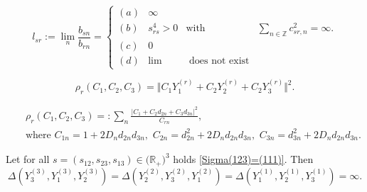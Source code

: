 \documentclass[10pt,a4paper]{amsart}
\begin{document}
\begin{equation}
\label{l(sr)}
l_{sr}:=\lim_n\frac{b_{sn}}{b_{rn}}
=\!
\left\{\begin{array}{lccc}
(a)& \infty&&\\
(b)&s^{4}_{rs}>0&\text{with}&\sum_{n\in \mathbb Z}c^2_{sr,n}=\infty.\\
(c)&0&\\
(d)&\lim& \,\,\text{does not exist}
\end{array}\right.
\end{equation}

\begin{equation}
\label{rho(CCC)}
\rho_r(C_1,C_2,C_3)=
\Vert C_1Y_1^{(r)}+C_2Y_2^{(r)}+C_2Y_3^{(r)}\Vert ^2.
\end{equation}

\begin{eqnarray}
\label{rho_r(CCC)}
 &&
\rho_r(C_1,C_2,C_3)=
  :\sum_n\frac{\vert C_1+C_2d_{2n}+C_3d_{3n}\vert^2}
 {C_{rn}},\\
 \nonumber
  &&
\text{where}\,\,C_{1n}= 1\!+\!2D_nd_{2n}d_{3n},\,\,
C_{2n}= d_{2n}^2\!+\!2D_nd_{2n}d_{3n},\,\,C_{3n}= d_{3n}^2\!+\!2D_nd_{2n}d_{3n}.
 \end{eqnarray}

\begin{lem}
\label{l.park2}
Let 
for all $s=(s_{12},s_{23},s_{13})\in \big(\mathbb R_+\big)^3$ holds
\eqref{Sigma(123)=(111)}.
Then 
\begin{equation}
\label{3-Delta}
 \Delta(Y_3^{(3)},Y_1^{(3)},Y_2^{(3)})=
 \Delta(Y_2^{(2)},Y_3^{(2)},Y_1^{(2)})=
 \Delta(Y_1^{(1)},Y_2^{(1)},Y_3^{(1)})=\infty.
\end{equation}
\end{lem}
\end{document}
